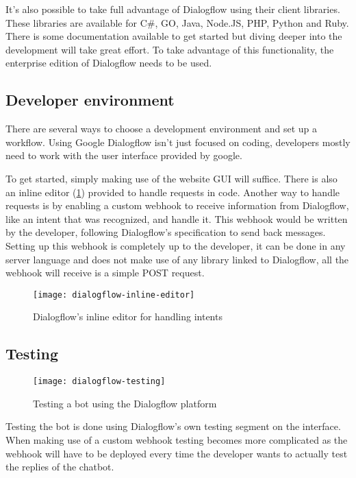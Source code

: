 It's also possible to take full advantage of Dialogflow using their client libraries. These libraries are available for C\#, GO, Java, Node.JS, PHP, Python and Ruby. There is some documentation available to get started but diving deeper into the development will take great effort. To take advantage of this functionality, the enterprise edition of Dialogflow needs to be used.

\subsection{Developer environment}

There are several ways to choose a development environment and set up a workflow. Using Google Dialogflow isn't just focused on coding, developers mostly need to work with the user interface provided by google.

To get started, simply making use of the website GUI will suffice. There is also an inline editor (\ref{fig:dialogflow-inline-editor}) provided to handle requests in code. Another way to handle requests is by enabling a custom webhook to receive information from Dialogflow, like an intent that was recognized, and handle it. This webhook would be written by the developer, following Dialogflow's specification to send back messages. Setting up this webhook is completely up to the developer, it can be done in any server language and does not make use of any library linked to Dialogflow, all the webhook will receive is a simple POST request.

\begin{figure}[ht]
	\centering
	\texttt{[image: dialogflow-inline-editor]}\label{fig:dialogflow-inline-editor}
	\caption{Dialogflow's inline editor for handling intents}
\end{figure}

\subsection{Testing}

\begin{wrapfigure}{r}{0.35\textwidth}
	\texttt{[image: dialogflow-testing]}\label{fig:dialogflow-testing}
	\caption{Testing a bot using the Dialogflow platform}
\end{wrapfigure}

Testing the bot is done using Dialogflow's own testing segment on the interface. When making use of a custom webhook testing becomes more complicated as the webhook will have to be deployed every time the developer wants to actually test the replies of the chatbot.

